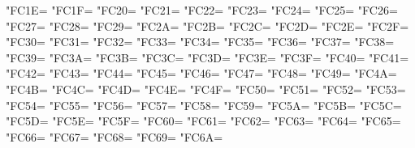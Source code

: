 \XeTeXcharclass"FC1E=\KclassArabU
\XeTeXcharclass"FC1F=\KclassArabU
\XeTeXcharclass"FC20=\KclassArabU
\XeTeXcharclass"FC21=\KclassArabU
\XeTeXcharclass"FC22=\KclassArabU
\XeTeXcharclass"FC23=\KclassArabU
\XeTeXcharclass"FC24=\KclassArabU
\XeTeXcharclass"FC25=\KclassArabU
\XeTeXcharclass"FC26=\KclassArabU
\XeTeXcharclass"FC27=\KclassArabU
\XeTeXcharclass"FC28=\KclassArabU
\XeTeXcharclass"FC29=\KclassArabU
\XeTeXcharclass"FC2A=\KclassArabU
\XeTeXcharclass"FC2B=\KclassArabU
\XeTeXcharclass"FC2C=\KclassArabU
\XeTeXcharclass"FC2D=\KclassArabU
\XeTeXcharclass"FC2E=\KclassArabU
\XeTeXcharclass"FC2F=\KclassArabU
\XeTeXcharclass"FC30=\KclassArabU
\XeTeXcharclass"FC31=\KclassArabU
\XeTeXcharclass"FC32=\KclassArabU
\XeTeXcharclass"FC33=\KclassArabU
\XeTeXcharclass"FC34=\KclassArabU
\XeTeXcharclass"FC35=\KclassArabU
\XeTeXcharclass"FC36=\KclassArabU
\XeTeXcharclass"FC37=\KclassArabU
\XeTeXcharclass"FC38=\KclassArabU
\XeTeXcharclass"FC39=\KclassArabU
\XeTeXcharclass"FC3A=\KclassArabU
\XeTeXcharclass"FC3B=\KclassArabU
\XeTeXcharclass"FC3C=\KclassArabU
\XeTeXcharclass"FC3D=\KclassArabU
\XeTeXcharclass"FC3E=\KclassArabU
\XeTeXcharclass"FC3F=\KclassArabU
\XeTeXcharclass"FC40=\KclassArabU
\XeTeXcharclass"FC41=\KclassArabU
\XeTeXcharclass"FC42=\KclassArabU
\XeTeXcharclass"FC43=\KclassArabU
\XeTeXcharclass"FC44=\KclassArabU
\XeTeXcharclass"FC45=\KclassArabU
\XeTeXcharclass"FC46=\KclassArabU
\XeTeXcharclass"FC47=\KclassArabU
\XeTeXcharclass"FC48=\KclassArabU
\XeTeXcharclass"FC49=\KclassArabU
\XeTeXcharclass"FC4A=\KclassArabU
\XeTeXcharclass"FC4B=\KclassArabU
\XeTeXcharclass"FC4C=\KclassArabU
\XeTeXcharclass"FC4D=\KclassArabU
\XeTeXcharclass"FC4E=\KclassArabU
\XeTeXcharclass"FC4F=\KclassArabU
\XeTeXcharclass"FC50=\KclassArabU
\XeTeXcharclass"FC51=\KclassArabU
\XeTeXcharclass"FC52=\KclassArabU
\XeTeXcharclass"FC53=\KclassArabU
\XeTeXcharclass"FC54=\KclassArabU
\XeTeXcharclass"FC55=\KclassArabU
\XeTeXcharclass"FC56=\KclassArabU
\XeTeXcharclass"FC57=\KclassArabU
\XeTeXcharclass"FC58=\KclassArabU
\XeTeXcharclass"FC59=\KclassArabU
\XeTeXcharclass"FC5A=\KclassArabU
\XeTeXcharclass"FC5B=\KclassArabU
\XeTeXcharclass"FC5C=\KclassArabU
\XeTeXcharclass"FC5D=\KclassArabU
\XeTeXcharclass"FC5E=\KclassArabU
\XeTeXcharclass"FC5F=\KclassArabU
\XeTeXcharclass"FC60=\KclassArabU
\XeTeXcharclass"FC61=\KclassArabU
\XeTeXcharclass"FC62=\KclassArabU
\XeTeXcharclass"FC63=\KclassArabU
\XeTeXcharclass"FC64=\KclassArabU
\XeTeXcharclass"FC65=\KclassArabU
\XeTeXcharclass"FC66=\KclassArabU
\XeTeXcharclass"FC67=\KclassArabU
\XeTeXcharclass"FC68=\KclassArabU
\XeTeXcharclass"FC69=\KclassArabU
\XeTeXcharclass"FC6A=\KclassArabU
